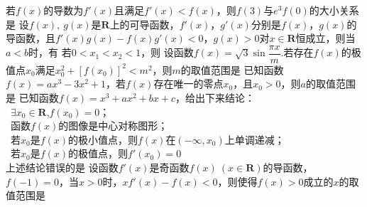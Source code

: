 \documentclass{BHCexam}
\begin{document}
\fubiaoti{}
\maketitle
\begin{questions}
\question
若$f(x)$的导数为$f'(x)$且满足$f'(x)<f(x)$，则$f(3)$与$e^3f(0)$的大小关系是\xx
{}
\question
设$f(x),~ g(x)$是$\mathbf{R}$上的可导函数，$f'(x)$，$g'(x)$分别是$f(x)$，$g(x)$的导函数，且$f'(x)g(x)-f(x)g'(x)<0$，$g(x)>0$对$x\in\mathbf{R}$恒成立，则当$a<b$时，有\xx
{}
\qs 若$ 0<x_1<x_2<1 $，则\xx
{}
\question
设函数$f(x)=\sqrt{3}\sin\dfrac{\pi x}{m}$.若存在$f(x)$的极值点$x_0$满足$x_0^2+\left[f(x_0)\right]^2<m^2$，则$m$的取值范围是\xx
{}
\question
已知函数$f(x)=ax^3-3x^2+1$，若$f(x)$存在唯一的零点$x_0$，且$x_0>0$，则$a$的取值范围是%
\xx%
{}
\question
已知函数$f(x)=x^3+ax^2+bx+c$，给出下来结论：\\
~$\exists x_0 \in \mathbf{R}$,$f(x_0)=0$；\\
~函数$f(x)$的图像是中心对称图形；\\
~若$x_0$是$f(x)$的极小值点，则$f(x)$在$(-\infty,x_0)$上单调递减；\\
~若$x_0$是$f(x)$的极值点，则$f'(x_0)=0$\\
上述结论错误的是\xx
{}
\question
设函数$f'(x)$是奇函数$f(x)~(x\in \mathbf{R})$的导函数，$f(-1)=0$，当$x>0$时，$xf'(x)-f(x)<0$，则使得$f(x)>0$成立的$x$的取值范围是\xx
{}

\end{questions}
\end{document}
